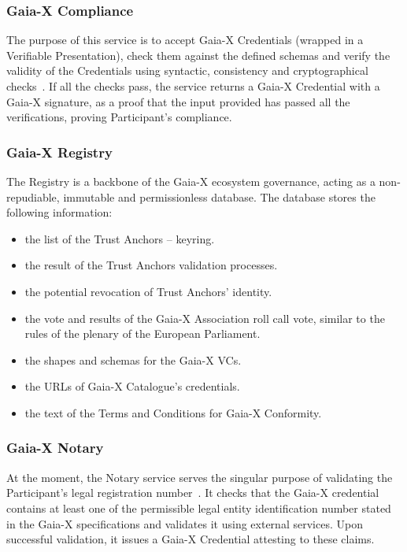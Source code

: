 \subsubsection{Gaia-X Compliance}

The purpose of this service is to accept Gaia-X Credentials (wrapped in a Verifiable Presentation), check them against the defined schemas and verify the validity of the Credentials using syntactic, consistency and cryptographical checks~\cite{gaiax_trust_framework}.
If all the checks pass, the service returns a Gaia-X Credential with a Gaia-X signature, as a proof that the input provided has passed all the verifications, proving Participant's compliance.

\subsubsection{Gaia-X Registry}

The Registry is a backbone of the Gaia-X ecosystem governance, acting as a non-repudiable, immutable and permissionless database\cite{gaiax_trust_framework}.
The database stores the following information:
\begin{itemize}
    \item the list of the Trust Anchors – keyring.
    \item the result of the Trust Anchors validation processes.
    \item the potential revocation of Trust Anchors' identity.
    \item the vote and results of the Gaia-X Association roll call vote, similar to the rules of the plenary of the European Parliament.
    \item the shapes and schemas for the Gaia-X VCs.
    \item the URLs of Gaia-X Catalogue’s credentials.
    \item the text of the Terms and Conditions for Gaia-X Conformity.
\end{itemize}

\subsubsection{Gaia-X Notary}

At the moment, the Notary service serves the singular purpose of validating the Participant's legal registration number~\cite{gaiax_trust_framework}.
It checks that the Gaia-X credential contains at least one of the permissible legal entity identification number stated in the Gaia-X specifications and validates it using external services.
Upon successful validation, it issues a Gaia-X Credential attesting to these claims.


